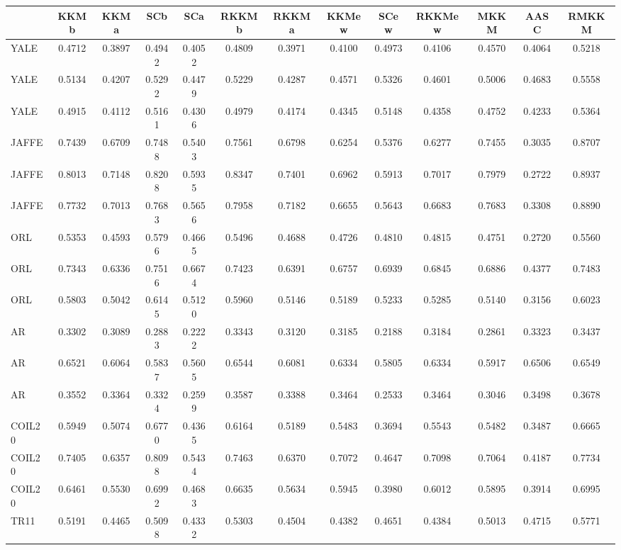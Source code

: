 \begin{tiny}\begin{tabular}{|l|c|c|c|c|c|c|c|c|c|c|c|c|}
\hline
&\textrm{KKMb}&\textrm{KKMa}&\textrm{SCb}&\textrm{SCa}&\textrm{RKKMb}&\textrm{RKKMa}&\textrm{KKMew}&\textrm{SCew}&\textrm{RKKMew}&\textrm{MKKM}&\textrm{AASC}&\textrm{RMKKM}\\\hline
\textrm{YALE}&0.4712&0.3897&0.4942&0.4052&0.4809&0.3971&0.4100&0.4973&0.4106&0.4570&0.4064&0.5218\\\hline
\textrm{YALE}&0.5134&0.4207&0.5292&0.4479&0.5229&0.4287&0.4571&0.5326&0.4601&0.5006&0.4683&0.5558\\\hline
\textrm{YALE}&0.4915&0.4112&0.5161&0.4306&0.4979&0.4174&0.4345&0.5148&0.4358&0.4752&0.4233&0.5364\\\hline
\textrm{JAFFE}&0.7439&0.6709&0.7488&0.5403&0.7561&0.6798&0.6254&0.5376&0.6277&0.7455&0.3035&0.8707\\\hline
\textrm{JAFFE}&0.8013&0.7148&0.8208&0.5935&0.8347&0.7401&0.6962&0.5913&0.7017&0.7979&0.2722&0.8937\\\hline
\textrm{JAFFE}&0.7732&0.7013&0.7683&0.5656&0.7958&0.7182&0.6655&0.5643&0.6683&0.7683&0.3308&0.8890\\\hline
\textrm{ORL}&0.5353&0.4593&0.5796&0.4665&0.5496&0.4688&0.4726&0.4810&0.4815&0.4751&0.2720&0.5560\\\hline
\textrm{ORL}&0.7343&0.6336&0.7516&0.6674&0.7423&0.6391&0.6757&0.6939&0.6845&0.6886&0.4377&0.7483\\\hline
\textrm{ORL}&0.5803&0.5042&0.6145&0.5120&0.5960&0.5146&0.5189&0.5233&0.5285&0.5140&0.3156&0.6023\\\hline
\textrm{AR}&0.3302&0.3089&0.2883&0.2222&0.3343&0.3120&0.3185&0.2188&0.3184&0.2861&0.3323&0.3437\\\hline
\textrm{AR}&0.6521&0.6064&0.5837&0.5605&0.6544&0.6081&0.6334&0.5805&0.6334&0.5917&0.6506&0.6549\\\hline
\textrm{AR}&0.3552&0.3364&0.3324&0.2599&0.3587&0.3388&0.3464&0.2533&0.3464&0.3046&0.3498&0.3678\\\hline
\textrm{COIL20}&0.5949&0.5074&0.6770&0.4365&0.6164&0.5189&0.5483&0.3694&0.5543&0.5482&0.3487&0.6665\\\hline
\textrm{COIL20}&0.7405&0.6357&0.8098&0.5434&0.7463&0.6370&0.7072&0.4647&0.7098&0.7064&0.4187&0.7734\\\hline
\textrm{COIL20}&0.6461&0.5530&0.6992&0.4683&0.6635&0.5634&0.5945&0.3980&0.6012&0.5895&0.3914&0.6995\\\hline
\textrm{TR11}&0.5191&0.4465&0.5098&0.4332&0.5303&0.4504&0.4382&0.4651&0.4384&0.5013&0.4715&0.5771\\\hline

\end{tabular}
\end{tiny}

